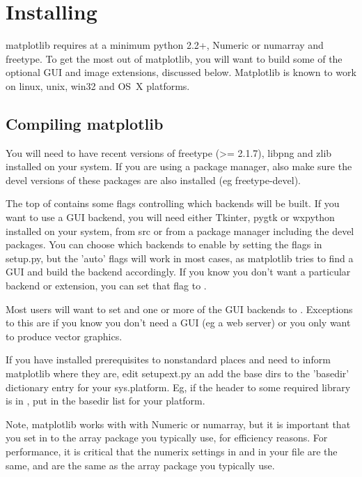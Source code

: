 \documentclass[twoside]{book}
\begin{document}
\section{Installing}
\label{sec:installing}

matplotlib requires at a minimum python 2.2+, Numeric or numarray and
freetype.  To get the most out of matplotlib, you will want to build
some of the optional GUI and image extensions, discussed below.
Matplotlib is known to work on linux, unix, win32 and OS~X platforms.

\subsection{Compiling matplotlib}
\label{sec:compilng}

You will need to have recent versions of freetype (>= 2.1.7), libpng
and zlib installed on your system.  If you are using a package
manager, also make sure the devel versions of these packages are also
installed (eg freetype-devel).
  
The top of  contains some flags controlling which
backends will be built.  If you want to use a GUI backend, you will
need either Tkinter, pygtk or wxpython installed on your system, from
src or from a package manager including the devel packages.  You can
choose which backends to enable by setting the flags in setup.py, but
the 'auto' flags will work in most cases, as matplotlib tries to find
a GUI and build the backend accordingly.  If you know you don't want a
particular backend or extension, you can set that flag to .
  
Most users will want to set  and one or more of
the GUI backends to .  Exceptions to this are if you know
you don't need a GUI (eg a web server) or you only want to produce
vector graphics.
  
If you have installed prerequisites to nonstandard places and need to
inform matplotlib where they are, edit setupext.py an add the base
dirs to the 'basedir' dictionary entry for your sys.platform.  Eg, if
the header to some required library is in
, put  in the
basedir list for your platform.
  
Note, matplotlib works with with Numeric or numarray, but it is
important that you set  in  to the array
package you typically use, for efficiency reasons.  For performance, it
is critical that the numerix settings in  and in your
 file are the same, and are the same as the array
package you typically use.
  
\end{document}

